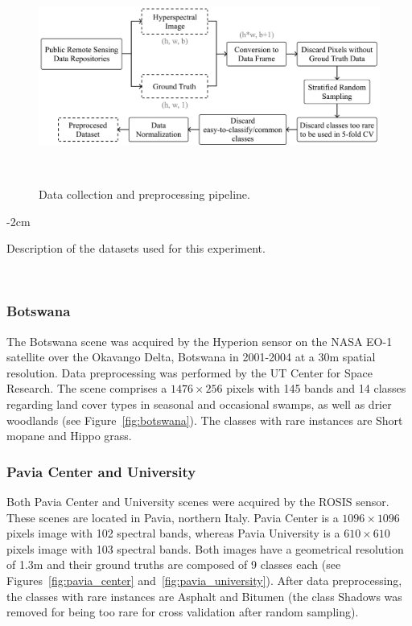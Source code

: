 \begin{figure}
	\centering
	\includegraphics[width=.75\linewidth]{data_preprocessing_pipeline}
    \caption{Data collection and preprocessing
    pipeline.}~\label{fig:data_preprocessing_pipeline}
\end{figure}

\begin{table}
	\centering
    \addtolength{\leftskip} {-2cm}
    \addtolength{\rightskip}{-2cm}
    \caption{Description of the datasets used for this
    experiment.}~\label{tab:datasets_description_kmeans}
\end{table}

\subsubsection*{Botswana}

The Botswana scene was acquired by the Hyperion sensor on the NASA EO-1
satellite over the Okavango Delta, Botswana in 2001-2004 at a 30m spatial
resolution. Data preprocessing was performed by the UT Center for Space
Research. The scene comprises a $1476 \times 256$ pixels with 145 bands and 14
classes regarding land cover types in seasonal and occasional swamps, as well
as drier woodlands (see Figure~\ref{fig:botswana}). The classes with
rare instances are Short mopane and Hippo grass.

\subsubsection*{Pavia Center and University}

Both Pavia Center and University scenes were acquired by the ROSIS sensor.
These scenes are located in Pavia, northern Italy. Pavia Center is a $1096
\times 1096$ pixels image with 102 spectral bands, whereas Pavia University is
a $610 \times 610$ pixels image with 103 spectral bands. Both images have a
geometrical resolution of 1.3m and their ground truths are
composed of 9 classes each (see Figures~\ref{fig:pavia_center}
and~\ref{fig:pavia_university}). After data preprocessing, the classes
with rare instances are Asphalt and Bitumen (the class Shadows was removed for
being too rare for cross validation after random sampling).

